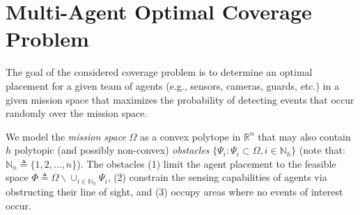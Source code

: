 \documentclass[letterpaper, 10 pt, conference]{ieeeconf}
\newcommand{\R}{\mathbb{R}}
\newcommand{\N}{\mathbb{N}}
\begin{document}


\vspace{-3mm}
\section{Multi-Agent Optimal Coverage Problem}
\label{Sec:CoverageProblem}
The goal of the considered coverage problem is to determine an optimal placement for a given team of agents (e.g., sensors, cameras, guards, etc.) in a given mission space that maximizes the probability of detecting events that occur randomly over the mission space. 


We model the \emph{mission space} $\Omega$ as a convex polytope in $\R^n$ that may also contain $h$ polytopic (and possibly non-convex) \emph{obstacles} $\{\Psi_i:\Psi_i\subset\Omega, i\in\mathbb{N}_h\}$ (note that: $\mathbb{N}_n \triangleq \{1,2,\ldots,n\}$). The obstacles (1) limit the agent placement to the feasible space $\Phi \triangleq \Omega \backslash \cup_{i\in\N_h} \Psi_i$, (2) constrain the sensing capabilities of agents via obstructing their line of sight, and (3) occupy areas where no events of interest occur. 
\end{document}
